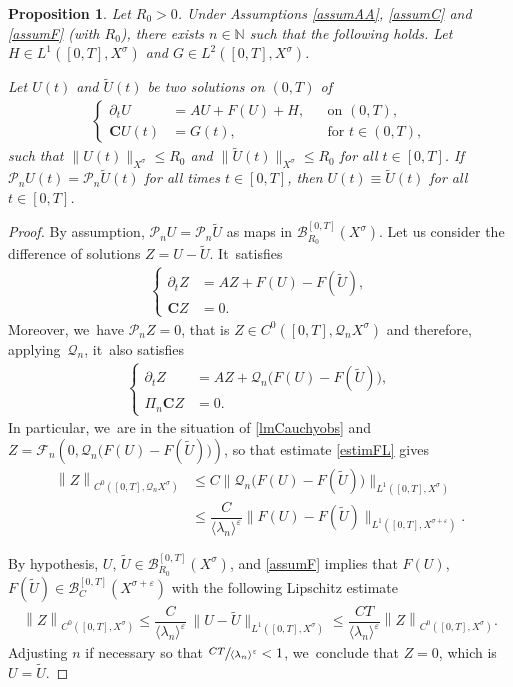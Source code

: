 \documentclass[10pt]{amsart}
\newcommand\bnor[2]{\bigl\|#1\bigr\|_{#2}}%
\newtheorem{proposition}[theorem]{Proposition}
\theoremstyle{definition}
\let\mc\mathcal
\let\ld\lambda
\let\veps\varepsilon
\newcommand{\B}{\mc{B}}
\newcommand{\N}{\mathbb{N}}
\newcommand{\Q}{\mathcal{Q}}
\renewcommand{\P}{\mathcal{P}}
\newcommand{\bC}{\boldsymbol{C}}
\providecommand{\norm}[1]{\lVert#1\rVert}
\providecommand{\inn}[1]{\langle#1\rangle}
\newcommand\nor[2]{\left\|#1\right\|_{#2}}
\newcommand\FL{\mathcal{F}_{n}}
\begin{document}
\begin{proposition}\label{prop:finite-det-modes}
Let $R_{0}>0$. Under Assumptions \ref{assumAA}, \ref{assumC} and \ref{assumF} (with $R_{0}$), there exists $n\in \N$ such that the following holds. Let $H\in L^1([0,T],X^{\sigma})$ and $G\in L^2([0, T], X^\sigma)$.

Let $U(t)$ and $\widetilde{U}(t)$ be two solutions on $(0,T)$ of
\begin{align*}
\left\{\begin{aligned}
\partial_t U&=AU+F(U)+H, &&\text{on } (0, T), \\
\bC U(t)&=G(t), && \text{for } t\in (0, T),
\end{aligned}\right.
\end{align*}
such that $\norm{U(t)}_{X^\sigma}\leq R_{0}$ and $\norm{\widetilde{U}(t)}_{X^\sigma}\leq R_{0}$ for all $t\in [0, T]$. If $\P_n U(t)=\P_n \widetilde{U}(t)$ for all times $t\in [0, T]$, then $U(t)\equiv \widetilde{U}(t)$ for all $t\in [0, T]$.
\end{proposition}
\begin{proof}
By assumption, $\P_{n}U=\P_{n}\widetilde{U}$ as maps in $\B_{R_{0}}^{[0,T]}(X^{\sigma})$. Let us consider the difference of solutions $Z=U-\widetilde{U}$. It~satisfies
\begin{align*}
\left\{\begin{aligned}
\partial_t Z&=AZ+F(U)-F(\widetilde{U}), \\
\bC Z&=0.
\end{aligned}\right.
\end{align*}
Moreover, we~have $\P_n Z=0$, that is $Z\in C^{0}([0,T],\Q_{n}X^{\sigma})$ and therefore, applying~$\Q_n$, it~also satisfies
\begin{align*}
\left\{\begin{aligned}
\partial_t Z&=AZ+\Q_n \bigl(F(U)-F(\widetilde{U})\bigr), \\
\Pi_{n}\bC Z&=0.
\end{aligned}\right.
\end{align*}
In particular, we~are in the situation of \cref{lmCauchyobs} and $Z=\FL(0,\Q_n \big(F(U)-F(\widetilde{U})\big))$, so that estimate \eqref{estimFL} gives
\begin{align*}
\nor{Z}{C^{0}([0,T],\Q_{n}X^{\sigma})}&\leq C \bnor{\Q_n \bigl(F(U)-F(\widetilde{U})\bigr)}{L^{1}([0,T],X^{\sigma})}\\
&\leq \dfrac{C}{\inn{\ld_n}^\veps} \bnor{F(U)-F(\widetilde{U})}{L^{1}([0,T],X^{\sigma+\veps})}.
\end{align*}

By hypothesis, $U$, $\widetilde{U}\in \B_{R_0}^{[0, T]}(X^\sigma)$, and \cref{assumF} implies that $F(U)$, $F(\widetilde{U})\in \B_{C}^{[0,T]}(X^{\sigma+\veps})$ with the following Lipschitz estimate
\begin{align*}
\nor{Z}{C^{0}([0,T],X^{\sigma})}\leq \dfrac{C}{\inn{\ld_n}^\veps}\, \bnor{U-\widetilde{U}}{L^{1}([0,T],X^{\sigma})}\leq \dfrac{CT}{\inn{\ld_n}^\veps} \nor{Z}{C^{0}([0,T],X^{\sigma})}.
\end{align*}
Adjusting $n$ if necessary so that $\sfrac{CT}{\inn{\ld_n}^\veps}<1$, we~conclude that $Z=0$, which is $U= \widetilde{U}$.
\end{proof}
\end{document}
